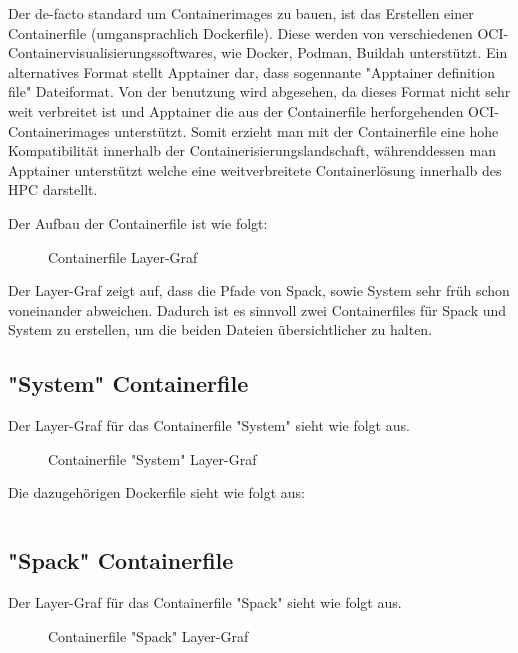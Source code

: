Der de-facto standard um Containerimages zu bauen, ist das Erstellen einer Containerfile (umgansprachlich Dockerfile). Diese werden von verschiedenen OCI-Containervisualisierungssoftwares, wie Docker, Podman, Buildah unterstützt. Ein alternatives Format stellt Apptainer dar, dass sogennante "Apptainer definition file" Dateiformat. Von der benutzung wird abgesehen, da dieses Format nicht sehr weit verbreitet ist und Apptainer die aus der Containerfile herforgehenden OCI-Containerimages unterstützt. Somit erzieht man mit der Containerfile eine hohe Kompatibilität innerhalb der Containerisierungslandschaft, währenddessen man Apptainer unterstützt welche eine weitverbreitete Containerlösung innerhalb des HPC darstellt. 

Der Aufbau der Containerfile ist wie folgt:

\begin{figure}[!htbp]
    \centering
    
    \caption{Containerfile Layer-Graf}
\end{figure}

Der Layer-Graf zeigt auf, dass die Pfade von Spack, sowie System sehr früh schon voneinander abweichen. Dadurch ist es sinnvoll zwei Containerfiles für Spack und System zu erstellen, um die beiden Dateien übersichtlicher zu halten. 

\subsection{"System" Containerfile}

Der Layer-Graf für das Containerfile "System" sieht wie folgt aus. 
\begin{figure}[!htbp]
    \centering
    
    \caption{Containerfile "System" Layer-Graf}
\end{figure}

Die dazugehörigen Dockerfile sieht wie folgt aus: 

\inputminted{dockerfile}{./code-examples/Dockerfile.system}

\subsection{"Spack" Containerfile}
Der Layer-Graf für das Containerfile "Spack" sieht wie folgt aus.
\begin{figure}[!htbp]
    \centering
    
    \caption{Containerfile "Spack" Layer-Graf}
\end{figure}

